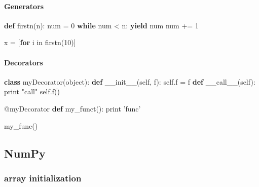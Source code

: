 \documentclass[10pt,a4paperpaper,twocolumn]{article}
\newenvironment{Shaded}{}{}
\newcommand{\KeywordTok}[1]{\textcolor[rgb]{0.00,0.44,0.13}{\textbf{{#1}}}}
\newcommand{\DecValTok}[1]{\textcolor[rgb]{0.25,0.63,0.44}{{#1}}}
\newcommand{\StringTok}[1]{\textcolor[rgb]{0.25,0.44,0.63}{{#1}}}
\newcommand{\FunctionTok}[1]{\textcolor[rgb]{0.02,0.16,0.49}{{#1}}}
\newcommand{\VariableTok}[1]{\textcolor[rgb]{0.10,0.09,0.49}{{#1}}}
\newcommand{\ControlFlowTok}[1]{\textcolor[rgb]{0.00,0.44,0.13}{\textbf{{#1}}}}
\newcommand{\OperatorTok}[1]{\textcolor[rgb]{0.40,0.40,0.40}{{#1}}}
\newcommand{\BuiltInTok}[1]{{#1}}
\newcommand{\AttributeTok}[1]{\textcolor[rgb]{0.49,0.56,0.16}{{#1}}}
\newcommand{\NormalTok}[1]{{#1}}
\let\oldparagraph\paragraph
\renewcommand{\paragraph}[1]{\oldparagraph{#1}\mbox{}}
\begin{document}
\hypertarget{generators}{\paragraph{Generators}\label{generators}}

\begin{Shaded}
\begin{Highlighting}[]
\KeywordTok{def} \NormalTok{firstn(n):}
    \NormalTok{num }\OperatorTok{=} \DecValTok{0}
    \ControlFlowTok{while} \NormalTok{num }\OperatorTok{<} \NormalTok{n:}
        \ControlFlowTok{yield} \NormalTok{num}
        \NormalTok{num }\OperatorTok{+=} \DecValTok{1}

\NormalTok{x }\OperatorTok{=} \NormalTok{[}\ControlFlowTok{for} \NormalTok{i }\OperatorTok{in} \NormalTok{firstn(}\DecValTok{10}\NormalTok{)]}
\end{Highlighting}
\end{Shaded}

\hypertarget{decorators}{\paragraph{Decorators}\label{decorators}}

\begin{Shaded}
\begin{Highlighting}[]
\KeywordTok{class} \NormalTok{myDecorator(}\BuiltInTok{object}\NormalTok{):}
    \KeywordTok{def} \FunctionTok{__init__}\NormalTok{(}\VariableTok{self}\NormalTok{, f):}
        \VariableTok{self}\NormalTok{.f }\OperatorTok{=} \NormalTok{f}
    \KeywordTok{def} \FunctionTok{__call__}\NormalTok{(}\VariableTok{self}\NormalTok{):}
        \BuiltInTok{print} \StringTok{"call"}
        \VariableTok{self}\NormalTok{.f()}

\AttributeTok{@myDecorator}
\KeywordTok{def} \NormalTok{my_funct():}
    \BuiltInTok{print} \StringTok{'func'}

\NormalTok{my_func()}
\end{Highlighting}
\end{Shaded}

\hypertarget{numpy}{\subsection{NumPy}\label{numpy}}

\hypertarget{array-initialization}{\subsubsection{array
initialization}\label{array-initialization}}
\end{document}
